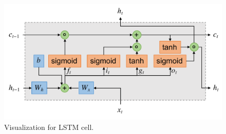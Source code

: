 \begin{figure}[!h]
	\centering
	\includegraphics[width=\fig\textwidth]{3-04.pdf}
    \caption[Visualization for LSTM cell]{Visualization for LSTM cell.}
    \label{fig:lstmcell}
\end{figure}